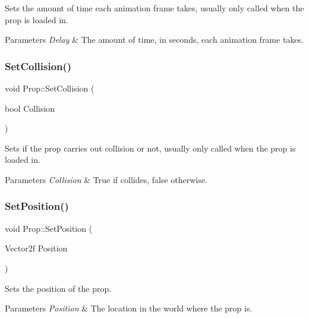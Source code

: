 Sets the amount of time each animation frame takes, usually only called when the prop is loaded in. 


\begin{DoxyParams}{Parameters}
{\em Delay} & The amount of time, in seconds, each animation frame takes.\\
\hline
\end{DoxyParams}
\mbox{\label{class_prop_af3ed9a53c617166e29a655d39a884999}} 
\subsubsection{\texorpdfstring{Set\+Collision()}{SetCollision()}}
{\footnotesize\ttfamily void Prop\+::\+Set\+Collision (\begin{DoxyParamCaption}\item[{bool}]{Collision }\end{DoxyParamCaption})}



Sets if the prop carries out collision or not, usually only called when the prop is loaded in. 


\begin{DoxyParams}{Parameters}
{\em Collision} & True if collides, false otherwise.\\
\hline
\end{DoxyParams}
\mbox{\label{class_prop_abb90ef176de5d431de4714d94bfa3bf2}} 
\subsubsection{\texorpdfstring{Set\+Position()}{SetPosition()}}
{\footnotesize\ttfamily void Prop\+::\+Set\+Position (\begin{DoxyParamCaption}\item[{Vector2f}]{Position }\end{DoxyParamCaption})}



Sets the position of the prop. 


\begin{DoxyParams}{Parameters}
{\em Position} & The location in the world where the prop is.\\
\hline
\end{DoxyParams}
\mbox{\label{class_prop_a5f94f90ac04f9b1469dd79c16ca9cd1e}} 
